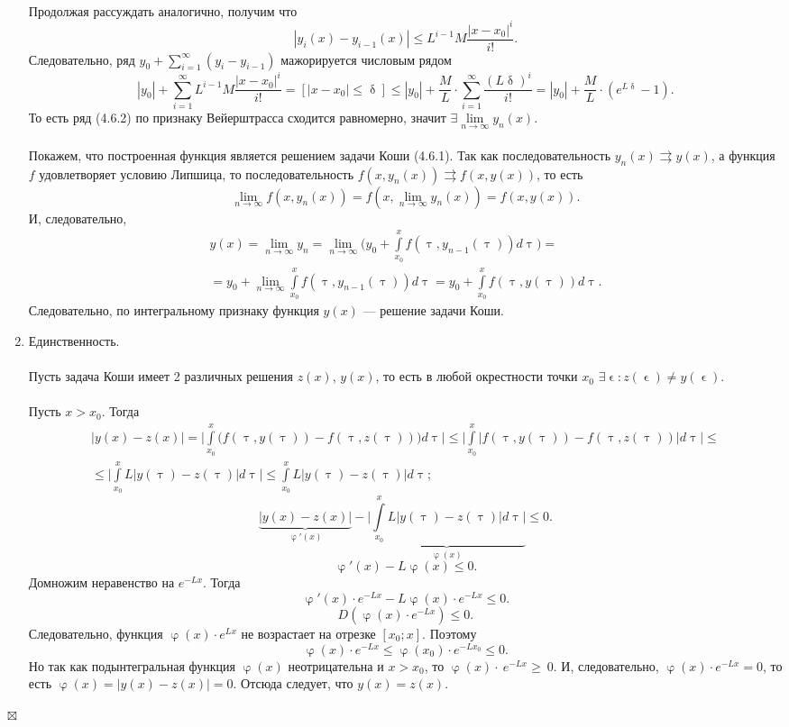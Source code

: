 \documentclass[a4paper, 12pt]{report}
\newenvironment{Proof} %
{\par\noindent{$\blacklozenge$}} %
{\hfill$\scriptstyle\boxtimes$}
\renewcommand{\leq}{\leqslant}
\renewcommand{\geq}{\geqslant}
\renewcommand{\delta}{\updelta}
\renewcommand{\varphi}{\upvarphi}
\renewcommand{\tau}{\uptau}
\renewcommand{\epsilon}{\upvarepsilon}
\newcommand{\intx}{\int\limits_{x_0}^x}
\begin{document}
\begin{Proof}
\begin{enumerate}
\begin{multline*}
				\end{multline*}
			Продолжая рассуждать аналогично, получим что $$|y_i(x) - y_{i-1}(x)|\leq L^{i-1}M\dfrac{|x - x_0|^i}{i!}.$$
			Следовательно, ряд $y_0 + \sum_{i=1}^{\infty}(y_i - y_{i-1})$ мажорируется числовым рядом
			$$|y_0| + \sum_{i=1}^{\infty}L^{i-1}M\dfrac{|x - x_0|^i}{i!} = [|x-x_0|\leq\delta] \leq |y_0| + \dfrac{M}{L}\cdot\sum_{i=1}^{\infty}\dfrac{(L\delta)^i}{i!} = |y_0|+\dfrac{M}{L}\cdot (e^{L\delta} - 1).$$
			То есть ряд (4.6.2) по признаку Вейерштрасса сходится равномерно, значит $\exists \lim\limits_{n\to \infty}y_n(x)$. \\\\
			Покажем, что построенная функция является решением задачи Коши (4.6.1). Так как последовательность $y_n(x)\rightrightarrows y(x)$, а функция $f$ удовлетворяет условию Липшица, то последовательность $f(x,y_n(x))\rightrightarrows f(x,y(x))$, то есть
			$$\lim\limits_{n\to \infty}f(x,y_n(x)) = f(x, \lim\limits_{n\to\infty} y_n(x)) = f(x,y(x)).$$
			И, следовательно, \begin{multline*}
				y(x) = \lim\limits_{n\to \infty} y_n = \lim\limits_{n\to \infty}\Big(y_0 + \intx f(\tau, y_{n-1}(\tau))d\tau\Big) =\\= y_0 + \lim\limits_{n\to \infty}\intx f(\tau, y_{n-1}(\tau))d\tau = y_0 + \intx f(\tau, y(\tau))d\tau.
			\end{multline*}
		Следовательно, по интегральному признаку функция $y(x)$ --- решение задачи Коши.
		\item Единственность.\\\\
		Пусть задача Коши имеет 2 различных решения $z(x)$, $y(x)$, то есть в любой окрестности точки $x_0$ $\exists\epsilon : z(\epsilon)\ne y(\epsilon)$.\\\\
		Пусть $x > x_0$. Тогда\begin{multline*}
			|y(x) - z(x)| = \Big|\intx \big(f(\tau,y(\tau)) - f(\tau,z(\tau))\big)d\tau\Big|\leq \Big| \intx \big|f(\tau,y(\tau)) - f(\tau,z(\tau))\big|d\tau\Big| \leq \\ \leq  \Big|\intx L \big|y(\tau) -z(\tau)\big|d\tau\Big| \leq \intx L \big|y(\tau) -z(\tau)\big|d\tau;
		\end{multline*}
		$$\underbrace{|y(x)-z(x)|}_{\varphi'(x)} - \underbrace{\Big|\intx L \big|y(\tau) -z(\tau)\big|d\tau\Big|}_{\varphi(x)} \leq 0.$$
		$$\varphi'(x) - L\varphi(x) \leq 0.$$
		Домножим неравенство на $e^{-Lx}$. Тогда
			$$\varphi'(x)\cdot e^{-Lx} - L\varphi(x)\cdot  e^{-Lx} \leq 0.$$
			$$D(\varphi(x)\cdot e^{-Lx})\leq 0.$$
			Следовательно, функция $\varphi(x)\cdot e^{Lx}$ не возрастает на отрезке $[x_0;x]$. Поэтому $$\varphi(x)\cdot e^{-Lx} \leq \varphi(x_0)\cdot  e^{-Lx_0}\leq0.$$ Но так как подынтегральная функция $\varphi(x)$ неотрицательна и $x > x_0$, то $\varphi(x)\cdot~e^{-Lx}\geq~0$. И, следовательно, $\varphi(x)\cdot e^{-Lx} = 0$, то есть $\varphi(x) = |y(x) - z(x)| = 0$. Отсюда следует, что $y(x) = z(x)$.
			\end{enumerate}
\end{Proof}
\end{document}
